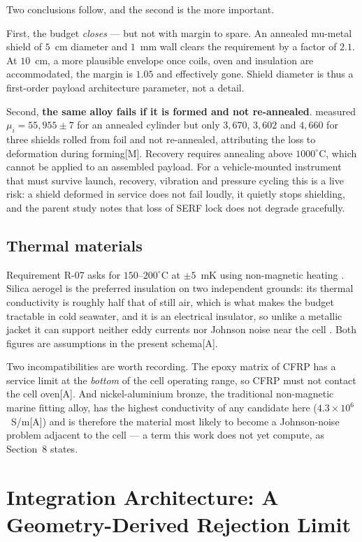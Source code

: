 \documentclass[11pt]{article}
\newcommand{\meas}{\textcolor{blue!55!black}{\footnotesize[M]}}
\newcommand{\assm}{\textcolor{red!65!black}{\footnotesize[A]}}
\begin{document}
Two conclusions follow, and the second is the more important.

First, the budget \emph{closes} --- but not with margin to spare. An annealed
mu-metal shield of $5$~cm diameter and $1$~mm wall clears the requirement by a
factor of $2.1$. At $10$~cm, a more plausible envelope once coils, oven and
insulation are accommodated, the margin is $1.05$ and effectively gone. Shield
diameter is thus a first-order payload architecture parameter, not a detail.

Second, \textbf{the same alloy fails if it is formed and not re-annealed}.
\cite{gohil2020} measured $\mu_i=55{,}955\pm7$ for an annealed cylinder but only
$3{,}670$, $3{,}602$ and $4{,}660$ for three shields rolled from foil and not
re-annealed, attributing the loss to deformation during forming\meas. Recovery
requires annealing above $1000^\circ$C, which cannot be applied to an assembled
payload. For a vehicle-mounted instrument that must survive launch, recovery,
vibration and pressure cycling this is a live risk: a shield deformed in service
does not fail loudly, it quietly stops shielding, and the parent study notes that
loss of SERF lock does not degrade gracefully.

\subsection{Thermal materials}
Requirement R-07 asks for $150$--$200^\circ$C at $\pm5$~mK using non-magnetic
heating \cite{fang2015}. Silica aerogel is the preferred insulation on two
independent grounds: its thermal conductivity is roughly half that of still air,
which is what makes the budget tractable in cold seawater, and it is an
electrical insulator, so unlike a metallic jacket it can support neither eddy
currents nor Johnson noise near the cell \cite{lee2008}. Both figures are
assumptions in the present schema\assm.

Two incompatibilities are worth recording. The epoxy matrix of CFRP has a service
limit at the \emph{bottom} of the cell operating range, so CFRP must not contact
the cell oven\assm. And nickel-aluminium bronze, the traditional non-magnetic
marine fitting alloy, has the highest conductivity of any candidate here
($4.3\times10^{6}$~S/m\assm) and is therefore the material most likely to become
a Johnson-noise problem adjacent to the cell --- a term this work does not yet
compute, as Section~8 states.

\section{Integration Architecture: A Geometry-Derived Rejection Limit}
\end{document}
